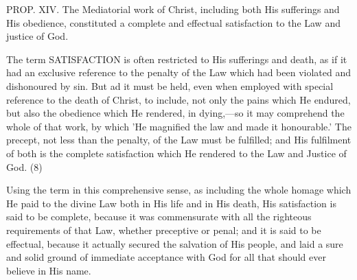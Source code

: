 \documentclass[
]{book}
\begin{document}
PROP. XIV. The Mediatorial work of Christ, including both His sufferings and His obedience, constituted a complete and effectual satisfaction to the Law and justice of God.

The term SATISFACTION is often restricted to His sufferings and death, as if it had an exclusive reference to the penalty of the Law which had been violated and dishonoured by sin. But ad it must be held, even when employed with special reference to the death of Christ, to include, not only the pains which He endured, but also the obedience which He rendered, in dying,---so it may comprehend the whole of that work, by which 'He magnified the law and made it honourable.' The precept, not less than the penalty, of the Law must be fulfilled; and His fulfilment of both is the complete satisfaction which He rendered to the Law and Justice of God. (8)

Using the term in this comprehensive sense, as including the whole homage which He paid to the divine Law both in His life and in His death, His satisfaction is said to be complete, because it was commensurate with all the righteous requirements of that Law, whether preceptive or penal; and it is said to be effectual, because it actually secured the salvation of His people, and laid a sure and solid ground of immediate acceptance with God for all that should ever believe in His name.
\end{document}
